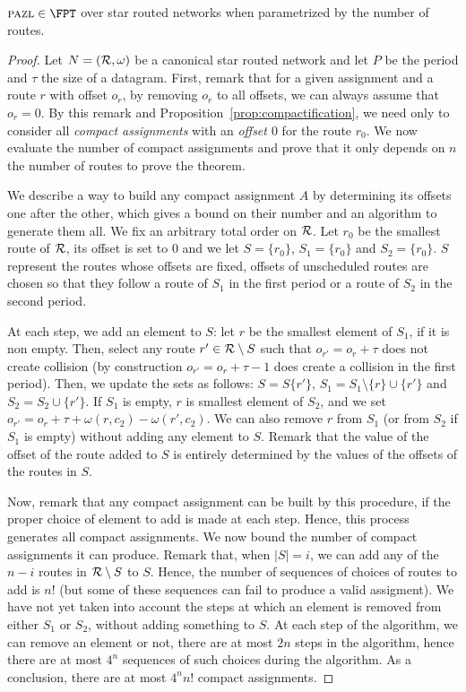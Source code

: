 \begin{theorem}\label{th:FPT}
$\pazl \in \FPT$ over star routed networks when parametrized by the number of routes.
\end{theorem}
\begin{proof}
Let $N = ({\cal R},\omega)$ be a canonical star routed network and let $P$ be the period and $\tau$ the size of a datagram. First, remark that for a given assignment and a route $r$ with offset $o_r$, by removing $o_r$ to all offsets, we can always assume that $o_r = 0$. By this remark and Proposition~\ref{prop:compactification}, we need only to consider all \emph{compact assignments} with an \emph{offset $0$} for the route $r_0$. We now evaluate the number of compact assignments and prove that it only depends on $n$ the number of routes to prove the theorem.

 We describe a way to build any compact assignment $A$ by determining its offsets one after the other, which gives a bound on their number and an algorithm to generate them all. We fix an arbitrary total order on ${\cal R}$. Let $r_0$ be the smallest route of $\cal{R}$, its offset is set to $0$ and we let $S = \{r_0\}$,
 $S_1 = \{r_0\}$ and $S_2 = \{r_0\}$. $S$ represent the routes whose offsets are fixed, 
 offsets of unscheduled routes are chosen so that they follow a route of $S_1$ in the first period or a route of $S_2$ in the second period.

 At each step, we add an element to $S$: let $r$ be the smallest element of $S_1$, if it is non empty. Then, select any route $r' \in {\cal R} \setminus S$ 
 such that $o_{r'} = o_{r} + \tau$ does not create collision (by construction $o_{r'} = o_{r} + \tau - 1$ does create a collision in the first period). Then, we update the sets as follows:
 $S = S \{r'\}$, $S_1 = S_1 \setminus \{r\} \cup \{r'\}$ and $S_2 = S_2 \cup \{r'\}$. If 
 $S_1$ is empty, $r$ is smallest element of $S_2$, and we set $o_{r'} = o_{r} + \tau + \omega(r,c_2) - \omega(r',c_2)$.
 We can also remove $r$ from $S_1$ (or from $S_2$ if $S_1$ is empty) without adding any element to $S$. Remark that the value of the offset of the route added to $S$ is entirely determined by the values of the offsets of the routes in $S$.

 Now, remark that any compact assignment can be built by this procedure, if the proper choice of element to add is made at each step. Hence, this process generates all compact assignments. We now bound the number of compact assignments it can produce. Remark that, when $|S| = i$, we can add any of the $n-i$ routes in ${\cal R} \setminus S$ to $S$. Hence, the number of sequences of choices of routes to add is $n!$ (but some of these sequences can fail to produce a valid assigment). We have not yet taken into account the steps at which an element is removed from either $S_1$ or $S_2$, without adding something to $S$. At each step of the algorithm, we can remove an element or not, there are at most $2n$ steps in the algorithm, hence there are at most $4^n$ sequences of such choices during the algorithm. As a conclusion, there are at most $4^nn!$ compact assignments.


\end{proof}

